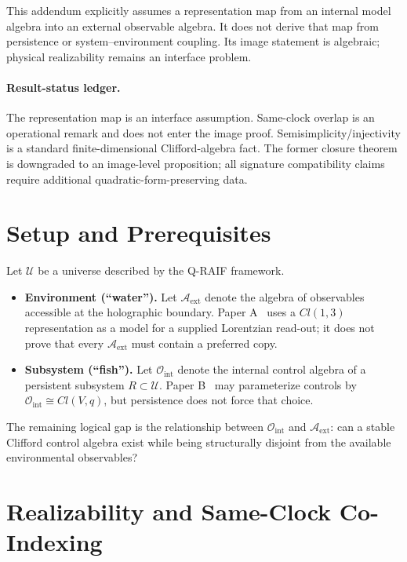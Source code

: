\documentclass[12pt,a4paper,openany]{book}
\begin{document}
This addendum explicitly assumes a representation map from an internal model algebra into an external observable algebra.  It does not derive that map from persistence or system--environment coupling.  Its image statement is algebraic; physical realizability remains an interface problem.

\paragraph{Result-status ledger.}
The representation map is an interface assumption.  Same-clock overlap is an operational remark and does not enter the image proof.  Semisimplicity/injectivity is a standard finite-dimensional Clifford-algebra fact.  The former closure theorem is downgraded to an image-level proposition; all signature compatibility claims require additional quadratic-form-preserving data.

\section{Setup and Prerequisites}
\label{Q-C-sec:setup}

Let $\mathcal{U}$ be a universe described by the Q-RAIF framework.
\begin{itemize}
    \item \textbf{Environment (``water'').} Let $\mathcal{A}_{\mathrm{ext}}$ denote the algebra of observables accessible at the holographic boundary.
    Paper A~\cite{Liu2026QRAIF_A} uses a $Cl(1,3)$ representation as a model for a supplied Lorentzian read-out; it does not prove that every $\mathcal A_{\mathrm{ext}}$ must contain a preferred copy.
    \item \textbf{Subsystem (``fish'').} Let $\mathcal{O}_{\mathrm{int}}$ denote the internal control algebra of a persistent subsystem $R\subset\mathcal{U}$.
    Paper B~\cite{Liu2026QRAIF_B} may parameterize controls by $\mathcal{O}_{\mathrm{int}}\cong Cl(V,q)$, but persistence does not force that choice.
\end{itemize}

The remaining logical gap is the relationship between $\mathcal{O}_{\mathrm{int}}$ and $\mathcal{A}_{\mathrm{ext}}$: can a stable Clifford control algebra exist while being structurally disjoint from the available environmental observables?

\section{Realizability and Same-Clock Co-Indexing}
\label{Q-C-sec:realizability}
\end{document}
